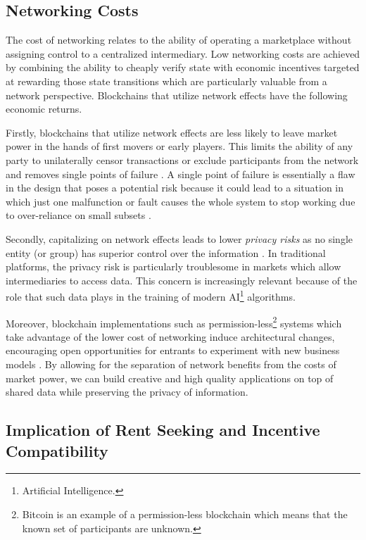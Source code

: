 \documentclass[12pt]{article}
\newcommand{\1}{\mathbbm 1}
\begin{document}
		\subsection{Networking Costs}
		
		The cost of networking relates to the ability of operating a marketplace without assigning control to a centralized intermediary. Low networking costs are achieved by combining the ability to cheaply verify state with economic incentives targeted at rewarding those state transitions which are particularly valuable from a network perspective. Blockchains that utilize network effects have the following economic returns.
		
		 Firstly, blockchains that utilize network effects are less likely to leave market power in the hands of first movers or early players. This limits the ability of any party to unilaterally censor transactions or exclude participants from the network  and removes single points of failure \cite{catalini2020some}. A single point of failure is essentially a flaw in the design that poses a potential risk because it could lead to a situation in which just one malfunction or fault causes the whole system to stop working due to over-reliance on small subsets \cite{noveck2011single}.
		 
		 Secondly, capitalizing on network effects leads to lower \textit{privacy risks} as no single entity (or group) has superior control over the information \cite{catalini2020some}. In traditional platforms, the privacy risk is particularly troublesome in markets which allow intermediaries to access data. This concern is increasingly relevant because of the role that such data plays in the training of modern AI\footnote{Artificial Intelligence.} algorithms.
		 
		 Moreover, blockchain implementations such as permission-less\footnote{Bitcoin is an example of a permission-less blockchain which means that the known set of participants are unknown.} systems which take advantage of the lower cost of networking induce architectural changes, encouraging open opportunities for entrants to experiment with new business models \cite{catalini2020some}. By allowing for the separation of network benefits from the costs of market power, we can build creative and high quality applications on top of shared data while preserving the privacy of information.
		
		
		
		\subsection{Implication of Rent Seeking and Incentive Compatibility}
\end{document}

